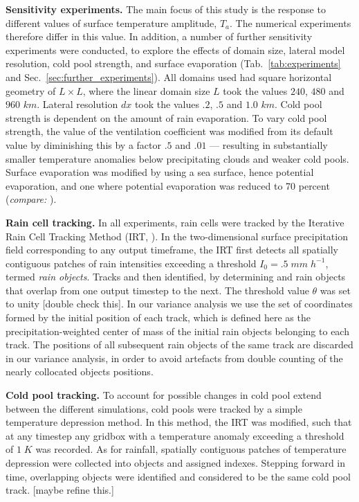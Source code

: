 \documentclass[draft,linenumbers]{agujournal2019}
\begin{document}
\noindent
{\bf Sensitivity experiments.} 
The main focus of this study is the response to different values of surface temperature amplitude, $T_a$. 
The numerical experiments therefore differ in this value.
In addition, a number of further sensitivity experiments were conducted, to explore the effects of domain size, lateral model resolution, cold pool strength, and surface evaporation (Tab.~\ref{tab:experiments} and Sec.~\ref{sec:further_experiments}).
All domains used had square horizontal geometry of $L\times L$, where the linear domain size $L$ took the values $240$, $480$ and $960$ $km$.
Lateral resolution $dx$ took the values $.2$, $.5$ and $1.0$ $km$.
Cold pool strength is dependent on the amount of rain evaporation. To vary cold pool strength, the value of the ventilation coefficient was modified from its default value \cite{seifert2006two} by diminishing this by a factor $.5$ and $.01$ --- resulting in substantially smaller temperature anomalies below precipitating clouds and weaker cold pools.
Surface evaporation was modified by using a sea surface, hence potential evaporation, and one where potential evaporation was reduced to 70 percent ({\it compare:} \cite{moseley2016}).

\noindent
{\bf Rain cell tracking.}
In all experiments, rain cells were tracked by the Iterative Rain Cell Tracking Method (IRT, \cite{moseley2019statistical}).
In the two-dimensional surface precipitation field corresponding to any output timeframe, the IRT first detects all spatially contiguous patches of rain intensities exceeding a threshold $I_0=.5\;mm\;h^{-1}$, termed {\it rain objects}.
Tracks and then identified, by determining and rain objects that overlap from one output timestep to the next. 
The threshold value $\theta$ was set to unity [double check this].
In our variance analysis we use the set of coordinates formed by the initial position of each track, which is defined here as the precipitation-weighted center of mass of the initial rain objects belonging to each track.
The positions of all subsequent rain objects of the same track are discarded in our variance analysis, in order to avoid artefacts from double counting of the nearly collocated objects positions.

\noindent
{\bf Cold pool tracking.}
To account for possible changes in cold pool extend between the different simulations, cold pools were tracked by a simple temperature depression method.
In this method, the IRT was modified, such that at any timestep any gridbox with a temperature anomaly exceeding a threshold of $1\;K$ was recorded.
As for rainfall, spatially contiguous patches of temperature depression were collected into objects and assigned indexes. 
Stepping forward in time, overlapping objects were identified and considered to be the same cold pool track.
[maybe refine this.]
\end{document}
